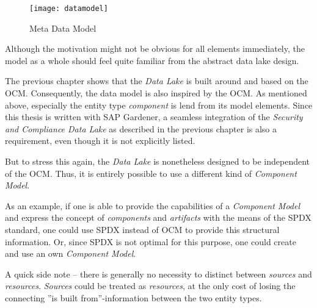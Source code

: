 \begin{figure}[H]
	\centering
	\texttt{[image: datamodel]}
	\caption[Meta Data Model]{Meta Data Model }
	\label{fig:DataModel}
\end{figure} 

Although the motivation might not be obvious for all elements immediately, the model as a whole should feel quite familiar from the abstract data lake design.\par
The previous chapter shows that the \emph{Data Lake} is built around and based on the OCM. Consequently, the data model is also inspired by the OCM. As mentioned above, especially the entity type \emph{component} is lend from its model elements. Since this thesis is written with SAP Gardener, a seamless integration of the \emph{Security and Compliance Data Lake} as described in the previous chapter is also a requirement, even though it is not explicitly listed.\par
But to stress this again, the \emph{Data Lake} is nonetheless designed to be independent of the OCM. Thus, it is entirely possible to use a different kind of \emph{Component Model}.\par 
As an example, if one is able to provide the capabilities of a \emph{Component Model} and express the concept of \emph{components} and \emph{artifacts} with the means of the SPDX standard, one could use SPDX instead of OCM to provide this structural information. Or, since SPDX is not optimal for this purpose, one could create and use an own \emph{Component Model}.\par
A quick side note -- there is generally no necessity to distinct between \emph{sources} and \emph{resources}. \emph{Sources} could be treated as \emph{resources}, at the only cost of losing the connecting ''is built from''-information between the two entity types.


